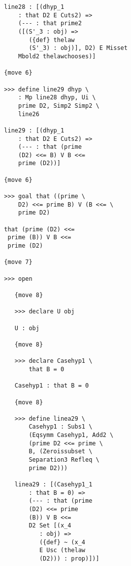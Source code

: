 \documentclass[12pt]{article}
\begin{document}
\begin{verbatim}
                     line28 : [(dhyp_1 
                         : that D2 E Cuts2) => 
                         (--- : that prime2 
                         ([(S'_3 : obj) => 
                            ({def} thelaw 
                            (S'_3) : obj)], D2) E Misset 
                         Mbold2 thelawchooses)]

                     {move 6}

                     >>> define line29 dhyp \
                         : Mp line28 dhyp, Ui \
                         prime D2, Simp2 Simp2 \
                         line26

                     line29 : [(dhyp_1 
                         : that D2 E Cuts2) => 
                         (--- : that (prime 
                         (D2) <<= B) V B <<= 
                         prime (D2))]

                     {move 6}

                     >>> goal that ((prime \
                         D2) <<= prime B) V (B <<= \
                         prime D2)

                     that (prime (D2) <<= 
                      prime (B)) V B <<= 
                      prime (D2)

                     {move 7}

                     >>> open

                        {move 8}

                        >>> declare U obj

                        U : obj

                        {move 8}

                        >>> declare Casehyp1 \
                            that B = 0

                        Casehyp1 : that B = 0

                        {move 8}

                        >>> define linea29 \
                            Casehyp1 : Subs1 \
                            (Eqsymm Casehyp1, Add2 \
                            (prime D2 <<= prime \
                            B, (Zeroissubset \
                            Separation3 Refleq \
                            prime D2)))

                        linea29 : [(Casehyp1_1 
                            : that B = 0) => 
                            (--- : that (prime 
                            (D2) <<= prime 
                            (B)) V B <<= 
                            D2 Set [(x_4 
                               : obj) => 
                               ({def} ~ (x_4 
                               E Usc (thelaw 
                               (D2))) : prop)])]


\end{verbatim}
\end{document}
